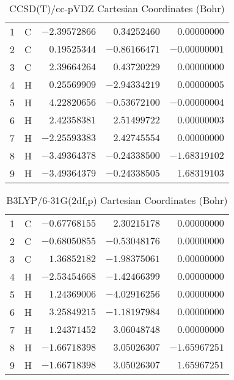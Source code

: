 \documentclass[10pt,oneside]{article}
\begin{document}
\begin{table}[h!]
\centering
\caption{CCSD(T)/cc-pVDZ Cartesian Coordinates (Bohr)}
\begin{tabular}{llrrr}
1  & C  & $-2.39572866$ & $ 0.34252460$ & $ 0.00000000$ \\
2  & C  & $ 0.19525344$ & $-0.86166471$ & $-0.00000001$ \\
3  & C  & $ 2.39664264$ & $ 0.43720229$ & $ 0.00000000$ \\
4  & H  & $ 0.25569909$ & $-2.94334219$ & $ 0.00000005$ \\
5  & H  & $ 4.22820656$ & $-0.53672100$ & $-0.00000004$ \\
6  & H  & $ 2.42358381$ & $ 2.51499722$ & $ 0.00000003$ \\
7  & H  & $-2.25593383$ & $ 2.42745554$ & $ 0.00000000$ \\
8  & H  & $-3.49364378$ & $-0.24338500$ & $-1.68319102$ \\
9  & H  & $-3.49364379$ & $-0.24338505$ & $ 1.68319103$ \\
\end{tabular}
\end{table}

\begin{table}[h!]
\centering
\caption{B3LYP/6-31G(2df,p) Cartesian Coordinates (Bohr)}
\begin{tabular}{llrrr}
1  & C  & $-0.67768155$ & $ 2.30215178$ & $ 0.00000000$ \\
2  & C  & $-0.68050855$ & $-0.53048176$ & $ 0.00000000$ \\
3  & C  & $ 1.36852182$ & $-1.98375061$ & $ 0.00000000$ \\
4  & H  & $-2.53454668$ & $-1.42466399$ & $ 0.00000000$ \\
5  & H  & $ 1.24369006$ & $-4.02916256$ & $ 0.00000000$ \\
6  & H  & $ 3.25849215$ & $-1.18197984$ & $ 0.00000000$ \\
7  & H  & $ 1.24371452$ & $ 3.06048748$ & $ 0.00000000$ \\
8  & H  & $-1.66718398$ & $ 3.05026307$ & $-1.65967251$ \\
9  & H  & $-1.66718398$ & $ 3.05026307$ & $ 1.65967251$ \\
\end{tabular}
\end{table}

\clearpage
\end{document}
